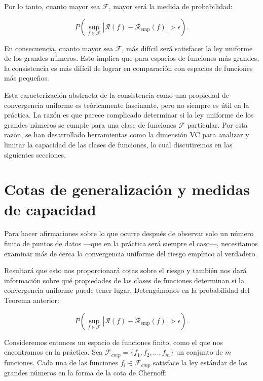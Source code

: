 \documentclass{article}
\begin{document}
Por lo tanto, cuanto mayor sea \(\mathcal{F}\), mayor será la medida de probabilidad:

\[
P\left(\sup_{f \in \mathcal{F}} |\mathcal{R}(f) - \mathcal{R}_{\text{emp}}(f)| > \epsilon \right).
\]

En consecuencia, cuanto mayor sea \(\mathcal{F}\), más difícil será satisfacer la ley uniforme de los grandes números. 
Esto implica que para espacios de funciones más grandes, la consistencia es más difícil de lograr en comparación 
con espacios de funciones más pequeños.\newline


Esta caracterización abstracta de la consistencia como una propiedad de convergencia uniforme es teóricamente 
fascinante, pero no siempre es útil en la práctica. La razón es que parece complicado determinar si la ley uniforme 
de los grandes números se cumple para una clase de funciones \(\mathcal{F}\) particular. Por esta razón, se han desarrollado 
herramientas como la dimensión VC para analizar y limitar la capacidad de las clases de funciones, lo cual discutiremos 
en las siguientes secciones.\newline

\section{Cotas de generalización y medidas de capacidad}

Para hacer afirmaciones sobre lo que ocurre después de observar solo un número finito de puntos de datos 
—que en la práctica será siempre el caso—, necesitamos examinar más de cerca la 
convergencia uniforme del riesgo empírico al verdadero.\newline

Resultará que esto nos proporcionará cotas sobre el riesgo y también nos dará información sobre 
qué propiedades de las clases de funciones determinan si la convergencia uniforme puede tener lugar. Detengámonos
en la probabilidad del Teorema anterior:

\begin{equation}
P\left(\sup_{f \in \mathcal{F}} |\mathcal{R}(f) - \mathcal{R}_{\text{emp}}(f)| > \epsilon \right). \label{eq:med_unif_riesgo_riesgo_emp}
\end{equation}

Consideremos entonces un espacio de funciones finito, como el que nos encontramos en la práctica. Sea
\(\mathcal{F}_{emp} = \{f_1, f_2, \dots, f_m\}\) un conjunto de \(m\) funciones. Cada una de las funciones 
\(f_i \in \mathcal{F}_{emp}\) satisface la ley estándar de los grandes números en la forma de la cota de Chernoff:
\end{document}
